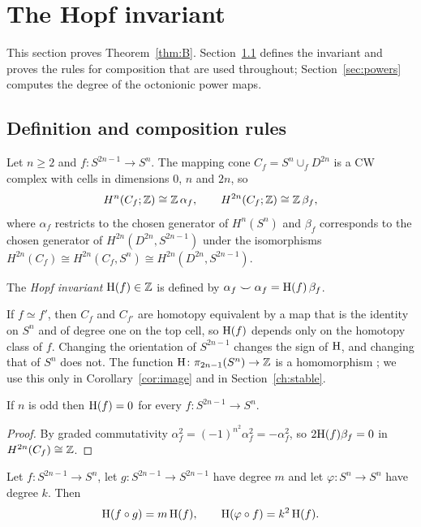 \section{The Hopf invariant}\label{ch:invariant}

This section proves Theorem~\ref{thm:B}. Section~\ref{sec:hdef} defines the invariant and proves the rules for composition that are used throughout; Section~\ref{sec:powers} computes the degree of the octonionic power maps.

\subsection{Definition and composition rules}\label{sec:hdef}

Let $n\ge2$ and $f\colon S^{2n-1}\to S^n$. The mapping cone $C_f=S^n\cup_fD^{2n}$ is a CW complex with cells in dimensions $0$, $n$ and $2n$, so
\[
H^n(C_f;\mathbb{Z})\cong\mathbb{Z}\,\alpha_f,\qquad H^{2n}(C_f;\mathbb{Z})\cong\mathbb{Z}\,\beta_f,
\]
where $\alpha_f$ restricts to the chosen generator of $H^n(S^n)$ and $\beta_f$ corresponds to the chosen generator of $H^{2n}(D^{2n},S^{2n-1})$ under the isomorphisms $H^{2n}(C_f)\cong H^{2n}(C_f,S^n)\cong H^{2n}(D^{2n},S^{2n-1})$.

\begin{definition}\label{def:hopfinv}
The \emph{Hopf invariant} $\mathrm{H}(f)\in\mathbb{Z}$ is defined by $\alpha_f\smile\alpha_f=\mathrm{H}(f)\,\beta_f$.
\end{definition}

If $f\simeq f'$, then $C_f$ and $C_{f'}$ are homotopy equivalent by a map that is the identity on $S^n$ and of degree one on the top cell, so $\mathrm{H}(f)$ depends only on the homotopy class of $f$. Changing the orientation of $S^{2n-1}$ changes the sign of $\mathrm{H}$, and changing that of $S^n$ does not. The function $\mathrm{H}\colon\pi_{2n-1}(S^n)\to\mathbb{Z}$ is a homomorphism \cite[Proposition~4B.1]{Hat02}; we use this only in Corollary~\ref{cor:image} and in Section~\ref{ch:stable}.

\begin{proposition}\label{prop:hodd}
If $n$ is odd then $\mathrm{H}(f)=0$ for every $f\colon S^{2n-1}\to S^n$.
\end{proposition}

\begin{proof}
By graded commutativity $\alpha_f^2=(-1)^{n^2}\alpha_f^2=-\alpha_f^2$, so $2\mathrm{H}(f)\beta_f=0$ in $H^{2n}(C_f)\cong\mathbb{Z}$.
\end{proof}

\begin{proposition}[Composition]\label{prop:composition}
Let $f\colon S^{2n-1}\to S^n$, let $g\colon S^{2n-1}\to S^{2n-1}$ have degree $m$ and let $\varphi\colon S^n\to S^n$ have degree $k$. Then
\[
\mathrm{H}(f\circ g)=m\,\mathrm{H}(f),\qquad \mathrm{H}(\varphi\circ f)=k^2\,\mathrm{H}(f).
\]
\end{proposition}

